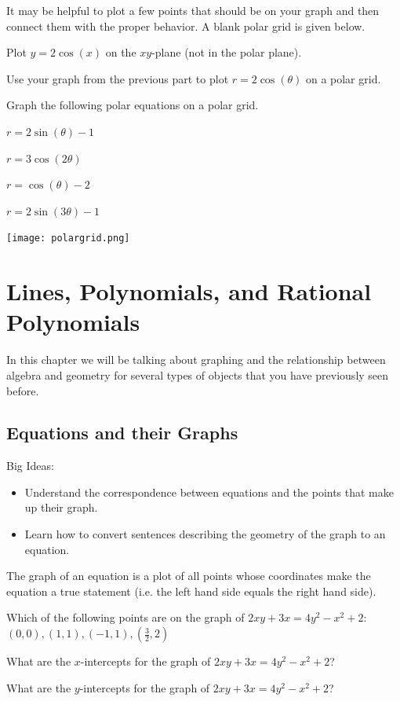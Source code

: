 \bq It may be helpful to plot a few points that should be on your graph and then connect them with the proper behavior. A blank polar grid is given below.
\be
\item Plot $y=2\cos(x)$ on the $xy$-plane (not in the polar plane).
\item Use your graph from the previous part to plot $r=2\cos(\theta)$ on a polar grid.
\ee
\eq

\bq Graph the following  polar equations on a polar grid.
\be
\item $r=2\sin(\theta)-1$
\item $r=3\cos(2\theta)$
\item $r=\cos(\theta)-2$
\item $r=2\sin(3 \theta)-1$
\ee
\eq

\begin{center} \texttt{[image: polargrid.png]} \end{center}


\chapter{Lines, Polynomials, and Rational Polynomials}
In this chapter we will be talking about graphing and the relationship between algebra and geometry for several types of objects that you have previously seen before.
\section{Equations and their Graphs}
Big Ideas:
\begin{itemize}
\item Understand the correspondence between equations and the points that make up their graph.
\item Learn how to convert sentences describing the geometry of the graph to an equation.
\end{itemize}

\begin{info} The graph of an equation is a plot of all points whose coordinates make the equation a true statement (i.e. the left hand side equals the right hand side). \end{info}

\bq Which of the following points are on the graph of $2xy+3x=4y^2-x^2+2$: $(0,0), (1,1), (-1,1), (\frac{3}{2},2)$
\eq

\bq What are the $x$-intercepts for the graph of $2xy+3x=4y^2-x^2+2$?
\eq

\bq What are the $y$-intercepts for the graph of $2xy+3x=4y^2-x^2+2$?
\eq

